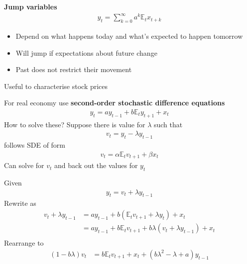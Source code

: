 \documentclass{beamer}
\begin{document}
\begin{frame}
  \textbf{Jump variables}
  \begin{align*}  
      y_t=\sum^{\infty}_{k=0}a^k\mathbb{E}_tx_{t+k} 
  \end{align*}
  \begin{itemize}
  \item Depend on what happens today and what's expected to happen tomorrow
  \item Will jump if expectations about future change
  \item Past does not restrict their movement
\end{itemize}
\medskip
Useful to characterise stock prices
\end{frame}

\begin{frame}
  For real economy use \textbf{second-order stochastic difference equations}
  \begin{align}  
    y_t=ay_{t-1} + b\mathbb{E}_ty_{t+1} + x_t 
  \end{align}
  \medskip
  How to solve these? Suppose there is value for $\lambda$ such that
  \begin{align}
    v_t=y_t-\lambda y_{t-1}  
  \end{align}
  follows SDE of form
  \begin{align}
  v_t=\alpha \mathbb{E}_tv_{t+1} + \beta x_t  
\end{align}
\medskip
Can solve for $v_t$ and back out the values for $y_t$
\end{frame}

\begin{frame}
  Given 
  \begin{align}
    y_t=v_t+\lambda y_{t-1}
  \end{align}
  Rewrite as
\begin{align}
  v_t+\lambda y_{t-1} &= ay_{t-1} + b(\mathbb{E}_tv_{t+1} + \lambda y_t) + x_t\\ \nonumber
  &= ay_{t-1} + b\mathbb{E}_tv_{t+1} + b\lambda(v_t + \lambda y_{t-1}) + x_t\\ \nonumber  
\end{align}
 Rearrange to
 \begin{align}
   (1-b\lambda)v_t &= b\mathbb{E}_tv_{t+1} + x_t + (b\lambda^2 - \lambda +a)y_{t-1}
 \end{align}
\end{frame}
\end{document}
